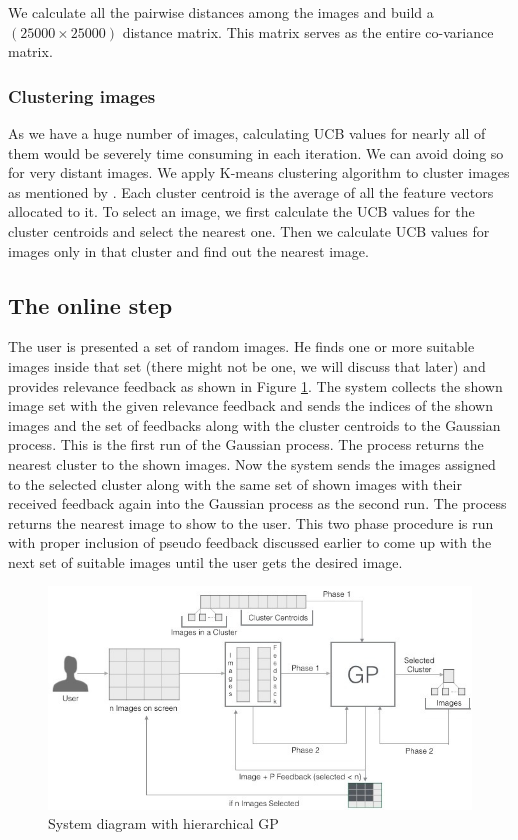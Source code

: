 \documentclass[english]{tktltiki}
\begin{document}
We calculate all the pairwise distances among the images and build a $(25000 \times 25000)$ distance matrix. This matrix serves as the entire co-variance matrix.

\subsubsection{Clustering images}

As we have a huge number of images, calculating UCB values for nearly all of them would be severely time consuming in each iteration. We can avoid doing so for very distant images. We apply K-means \cite{k_means} clustering algorithm to cluster images as mentioned by \cite{hierarchical_gp}. Each cluster centroid is the average of all the feature vectors allocated to it. To select an image, we first calculate the UCB values for the cluster centroids and select the nearest one. Then we calculate UCB values for images only in that cluster and find out the nearest image.

\subsection{The online step} \label{experiment_1}

The user is presented a set of random images. He finds one or more suitable images inside that set (there might not be one, we will discuss that later) and provides relevance feedback as shown in Figure \ref{system_diagram_1}. The system collects the shown image set with the given relevance feedback and sends the indices of the shown images and the set of feedbacks along with the cluster centroids to the Gaussian process. This is the first run of the Gaussian process. The process returns the nearest cluster to the shown images. Now the system sends the images assigned to the selected cluster along with the same set of shown images with their received feedback again into the Gaussian process as the second run. The process returns the nearest image to show to the user. This two phase procedure is run with proper inclusion of pseudo feedback discussed earlier to come up with the next set of suitable images until the user gets the desired image.


\begin{figure}[h!]
  \centering
    \includegraphics[width=1.0\textwidth]{figures/Imse_System_Diagram}
    \caption{System diagram with hierarchical GP}
    \label{system_diagram_1}
\end{figure}
\end{document}
